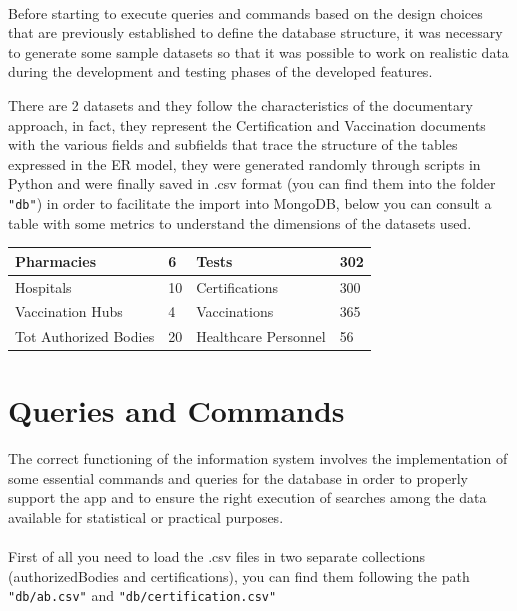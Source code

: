 \documentclass[a4paper,12pt]{article}
\begin{document}
\paragraph{} Before starting to execute queries and commands based on the design choices that are previously established to define the database structure, it was necessary to generate some sample datasets so that it was possible to work on realistic data during the development and testing phases of the
developed features. \par
There are 2 datasets and they follow the characteristics of the documentary approach, in fact, they represent the Certification and Vaccination documents with the various fields and subfields that trace the structure of the tables expressed in the ER model, they were generated randomly through scripts in Python and were finally saved in .csv format (you can find them into the folder \texttt{"db"}) in order to facilitate the import into MongoDB, below you can consult a table with some metrics to understand the dimensions of the datasets used.
\begin{center}
\begin{tabular}{|l|l|l|l|}
\hline
Pharmacies & 6 & Tests & 302 \\
\hline
Hospitals & 10 & Certifications & 300 \\
\hline
Vaccination Hubs & 4 & Vaccinations & 365 \\
\hline
Tot Authorized Bodies & 20 & Healthcare Personnel & 56 \\

\hline
\end{tabular}
\end{center}
\section{Queries and Commands}
\paragraph{} The correct functioning of the information system involves the implementation of some essential commands and queries for the database in order to properly support the app and to ensure the right execution of searches among the data available for statistical or practical purposes. \par
\paragraph{} First of all you need to load the .csv files in two separate collections (authorizedBodies and certifications), you can find them following the path \texttt{"db/ab.csv"} and \texttt{"db/certification.csv"}
\end{document}
